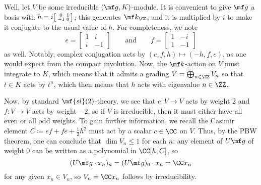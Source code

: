 \documentclass[../notes.tex]{subfiles}
\begin{document}
Well, let $V$ be some irreducible $(\mf g,K)$-module. It is convenient to give $\mf g$ a basis with $h=i\begin{bsmallmatrix}
	0 & 1 \\ -1 & 0
\end{bsmallmatrix}$; this generates $\mf k_\CC$, and it is multiplied by $i$ to make it conjugate to the usual value of $h$. For completeness, we note
\[e=\begin{bmatrix}
	1 & i \\
	i & -1
\end{bmatrix}\qquad\text{and}\qquad f=\begin{bmatrix}
	1 & -i \\ 1 & -1
\end{bmatrix}\]
as well. Notably, complex conjugation acts by $(e,f,h)\mapsto(-h,f,e)$, as one would expect from the compact involution. Now, the $\mf k$-action on $V$ must integrate to $K$, which means that it admits a grading $V=\bigoplus_{n\in\ZZ}V_n$ so that $t\in K$ acts by $t^n$, which then means that $h$ acts with eigenvalue $n\in\ZZ$.

Now, by standard $\mf{sl}(2)$-theory, we see that $e\colon V\to V$ acts by weight $2$ and $f\colon V\to V$ acts by weight $-2$, so if $V$ is irreducible, then it must either have all even or all odd weights. To gain further information, we recall the Casimir element $C\coloneqq ef+fe+\frac12 h^2$ must act by a scalar $c\in\CC$ on $V$. Thus, by the PBW theorem, one can conclude that $\dim V_n\le1$ for each $n$: any element of $U\mf g$ of weight $0$ can be written as a polynomial in $\CC[h,C]$, so
\[(U\mf g\cdot x_n)_n=(U\mf g)_0\cdot x_n=\CC x_n\]
for any given $x_n\in V_n$, so $V_n=\CC x_n$ follows by irreducibility.
\end{document}
